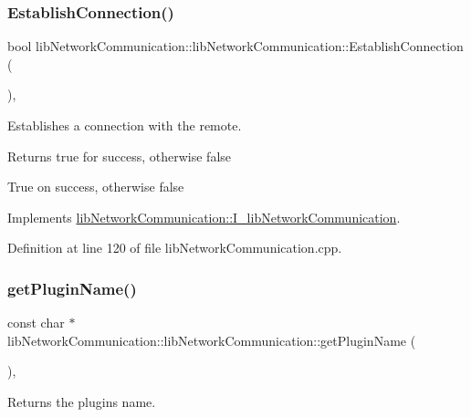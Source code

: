 \subsubsection{\texorpdfstring{EstablishConnection()}{EstablishConnection()}}
{\footnotesize\ttfamily bool lib\+Network\+Communication\+::lib\+Network\+Communication\+::\+Establish\+Connection (\begin{DoxyParamCaption}{ }\end{DoxyParamCaption})\hspace{0.3cm}{\ttfamily [override]}, {\ttfamily [virtual]}}



Establishes a connection with the remote. 

\begin{DoxyReturn}{Returns}
true for success, otherwise false

True on success, otherwise false 
\end{DoxyReturn}


Implements \mbox{\hyperlink{classlibNetworkCommunication_1_1I__libNetworkCommunication_a03c615443e3a028782677c78d559b1c1}{lib\+Network\+Communication\+::\+I\+\_\+lib\+Network\+Communication}}.



Definition at line 120 of file lib\+Network\+Communication.\+cpp.

\mbox{\label{classlibNetworkCommunication_1_1libNetworkCommunication_a2d09c69b582a66b37100ce87ee1acdd1}} 
\subsubsection{\texorpdfstring{getPluginName()}{getPluginName()}}
{\footnotesize\ttfamily const char $\ast$ lib\+Network\+Communication\+::lib\+Network\+Communication\+::get\+Plugin\+Name (\begin{DoxyParamCaption}{ }\end{DoxyParamCaption})\hspace{0.3cm}{\ttfamily [override]}, {\ttfamily [virtual]}}



Returns the plugins name. 

